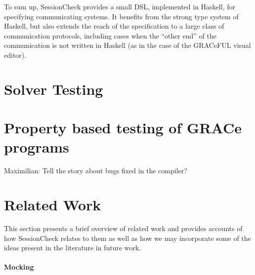 \documentclass{article}
\begin{document}
To sum up, SessionCheck provides a small DSL, implemented in Haskell,
for specifying communicating systems.
%
It benefits from the strong type system of Haskell, but also extends
the reach of the specification to a large class of communication
protocols, including cases when the ``other end'' of the communication
is not written in Haskell (as in the case of the GRACeFUL visual
editor).

\section{Solver Testing}



\section{Property based testing of GRACe programs}

Maximilian: Tell the story about bugs fixed in the compiler?



\section{Related Work}

This section presents a brief overview of related work and provides accounts
of how SessionCheck relates to them as well as how we may incorporate some of
the ideas present in the literature in future work.

\paragraph{Mocking}
\end{document}

